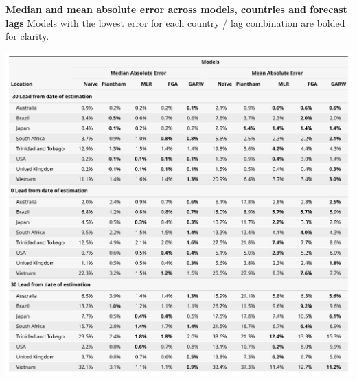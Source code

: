 \documentclass[11pt,oneside,letterpaper]{article}
\begin{document}
\begin{table}[tb!]
	\centering
	\caption{
		\textbf{Median and mean absolute error across models, countries and forecast lags}
		Models with the lowest error for each country / lag combination are bolded for clarity.
	}
	\includegraphics[width=1\textwidth]{figures/model_comp_table.png}
	\label{table:model_comp_table}
\end{table}
\end{document}
